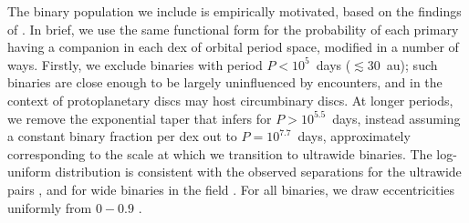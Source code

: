 \documentclass{aa}
\begin{document}
The binary population we include is empirically motivated, based on the findings of \citet{Moe17}. In brief, we use the same functional form for the probability of each primary having a companion in each dex of orbital period space, modified in a number of ways. Firstly, we exclude binaries with period $P< 10^{5}$~days ($\lesssim 30$~au); such binaries are close enough to be largely uninfluenced by encounters, and in the context of protoplanetary discs may host circumbinary discs. At longer periods, we remove the exponential taper that \citet{Moe17} infers for $P > 10^{5.5}$~days, instead assuming a constant binary fraction per dex out to $P= 10^{7.7}$~days, approximately corresponding to the scale at which we transition to ultrawide binaries. The log-uniform distribution is consistent with the observed separations for the ultrawide pairs \citep[see Fig. 7 of][]{Joncour17}, and for wide binaries in the field \citep{Lepine07}. For all binaries, we draw eccentricities uniformly from $0{-}0.9$ \citep[e.g][and review by \citealt{Duchene13}]{Abt06}. 
\end{document}
